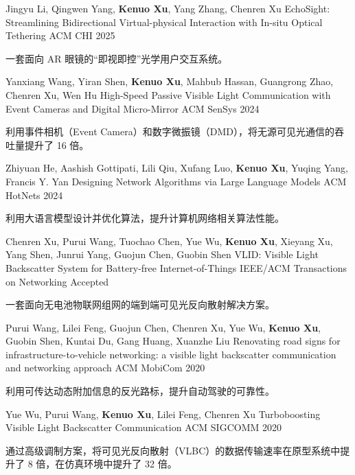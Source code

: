 \documentclass[11pt, a4paper]{awesome-cv-cn}
\begin{document}
\begin{cventries}
	\cventry
	{Jingyu Li, Qingwen Yang, \textbf{Kenuo Xu}, Yang Zhang, Chenren Xu}
	{EchoSight: Streamlining Bidirectional Virtual-physical Interaction with In-situ Optical Tethering}
	{ACM CHI}
	{2025}
	{
		\begin{cvitems} %
			\item {一套面向 AR 眼镜的“即视即控”光学用户交互系统。}
		\end{cvitems}
	}
	
	\cventry
	{Yanxiang Wang, Yiran Shen, \textbf{Kenuo Xu}, Mahbub Hassan, Guangrong Zhao, Chenren Xu, Wen Hu}
	{High-Speed Passive Visible Light Communication with Event Cameras and Digital Micro-Mirror}
	{ACM SenSys}
	{2024}
	{
		\begin{cvitems} %
			\item {利用事件相机（Event Camera）和数字微振镜（DMD），将无源可见光通信的吞吐量提升了 16 倍。}
		\end{cvitems}
	}
	
	\cventry
	{Zhiyuan He, Aashish Gottipati, Lili Qiu, Xufang Luo, \textbf{Kenuo Xu}, Yuqing Yang, Francis Y. Yan}
	{Designing Network Algorithms via Large Language Models}
	{ACM HotNets}
	{2024}
	{
		\begin{cvitems} %
			\item {利用大语言模型设计并优化算法，提升计算机网络相关算法性能。}
		\end{cvitems}
	}
	
	\cventry
	{Chenren Xu, Purui Wang, Tuochao Chen, Yue Wu, \textbf{Kenuo Xu}, Xieyang Xu, Yang Shen, Junrui Yang, Guojun Chen, Guobin Shen}
	{VLID: Visible Light Backscatter System for Battery-free Internet-of-Things}
	{IEEE/ACM Transactions on Networking}
	{Accepted}
	{
		\begin{cvitems} %
			\item {一套面向无电池物联网组网的端到端可见光反向散射解决方案。}
		\end{cvitems}
	}
	
	\cventry
	{Purui Wang, Lilei Feng, Guojun Chen, Chenren Xu, Yue Wu, \textbf{Kenuo Xu}, Guobin Shen, Kuntai Du, Gang Huang, Xuanzhe Liu}
	{Renovating road signs for infrastructure-to-vehicle networking: a visible light backscatter communication and networking approach}
	{ACM MobiCom}
	{2020}
	{
		\begin{cvitems} %
			\item {利用可传达动态附加信息的反光路标，提升自动驾驶的可靠性。}
		\end{cvitems}
	}
	
	\cventry
	{Yue Wu, Purui Wang, \textbf{Kenuo Xu}, Lilei Feng, Chenren Xu}
	{Turboboosting Visible Light Backscatter Communication}
	{ACM SIGCOMM}
	{2020}
	{
		\begin{cvitems} %
			\item {通过高级调制方案，将可见光反向散射（VLBC）的数据传输速率在原型系统中提升了 8 倍，在仿真环境中提升了 32 倍。}
		\end{cvitems}
	}
	
\end{cventries}
\end{document}
